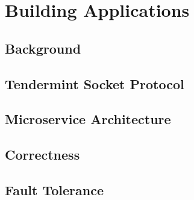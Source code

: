 \chapter{Building Applications}

\section{Background}

\section{Tendermint Socket Protocol}

\section{Microservice Architecture}

\section{Correctness}

\section{Fault Tolerance}
